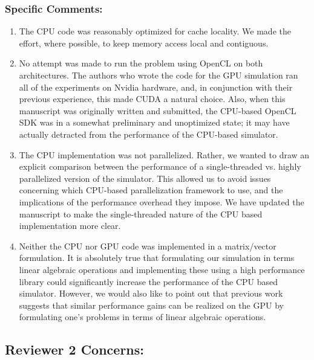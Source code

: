 \documentclass[10pt]{article}
\begin{document}
\subsubsection*{Specific Comments:}
\begin{enumerate}

\item The CPU code was reasonably optimized for cache locality.  We
  made the effort, where possible, to keep memory access local and
  contiguous.

\item No attempt was made to run the problem using OpenCL on both
  architectures.  The authors who wrote the code for the GPU
  simulation ran all of the experiments on Nvidia hardware, and, in
  conjunction with their previous experience, this made CUDA a natural
  choice.  Also, when this manuscript was originally written and
  submitted, the CPU-based OpenCL SDK was in a somewhat preliminary
  and unoptimized state; it may have actually detracted from the 
  performance of the CPU-based simulator.
  
\item The CPU implementation was not parallelized.  Rather, we wanted
  to draw an explicit comparison between the performance of a
  single-threaded vs. highly parallelized version of the simulator.
  This allowed us to avoid issues concerning which CPU-based
  parallelization framework to use, and the implications of the
  performance overhead they impose.  We have updated the manuscript to
  make the single-threaded nature of the CPU based implementation more
  clear.

\item Neither the CPU nor GPU code was implemented in a matrix/vector
  formulation.  It is absolutely true that formulating our simulation
  in terms linear algebraic operations and implementing these using a
  high performance library could significantly increase the
  performance of the CPU based simulator.  However, we would also like
  to point out that previous work suggests that similar performance
  gains can be realized on the GPU by formulating one's problems in
  terms of linear algebraic operations.

\end{enumerate}



\subsection*{Reviewer 2 Concerns:}
\end{document}
